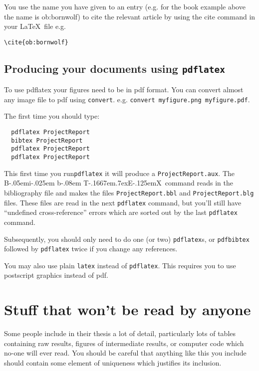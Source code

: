 \documentclass[12pt,a4paper]{report}
\def\BibTeX{{\rm B\kern-.05em{\sc i\kern-.025em b}\kern-.08em
    T\kern-.1667em\lower.7ex\hbox{E}\kern-.125emX}}
\begin{document}
You use the name you have given to an entry (e.g.
for the book example above the name is ob:bornwolf)
to cite the relevant article
by using the cite command in your \LaTeX\ file e.g. 
\begin{verbatim}
\cite{ob:bornwolf}
\end{verbatim}


\section{Producing your documents using \texttt{pdflatex}}

To use pdflatex your figures need to be in pdf format.  You can convert almost any image file to pdf using \texttt{convert}.  e.g. \texttt{convert myfigure.png myfigure.pdf}.

The first time you should type:
\begin{verbatim}
  pdflatex ProjectReport
  bibtex ProjectReport
  pdflatex ProjectReport
  pdflatex ProjectReport
\end{verbatim} 
This first time you run\texttt{pdflatex} it will produce a
\texttt{ProjectReport.aux}.  The \BibTeX\ command reads in the
bibliography file and makes the files \texttt{ProjectReport.bbl} and
\texttt{ProjectReport.blg} files.  These files are read in the next
\texttt{pdflatex} command, but you'll still have ``undefined
cross-reference'' errors which are sorted out by the last
\texttt{pdflatex} command.

Subsequently, you should only need to do one (or two)
\texttt{pdflatex}s, or \texttt{pdfbibtex} followed by
\texttt{pdflatex} twice if you change any references.

\vspace{5mm} You may also use plain \texttt{latex} instead of
\texttt{pdflatex}.  This requires you to use postscript graphics
instead of pdf.




\chapter{Stuff that won't be read by anyone}

Some people include in their thesis a lot of detail, particularly lots
of tables containing raw results, figures of intermediate results, or
computer code which no-one will ever read. You should be careful that
anything like this you include should contain some element of
uniqueness which justifies its inclusion.
\end{document}

